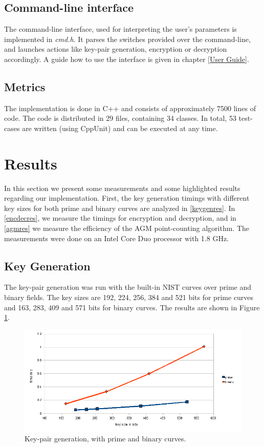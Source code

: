 \documentclass[11pt,english]{article}
\begin{document}
\subsection{Command-line interface}
The command-line interface, used for interpreting the user's parameters is implemented in \emph{cmd.h}. It parses the switches provided over the command-line, and launches actions like key-pair generation, encryption or decryption accordingly. A guide how to use the interface is given in chapter \ref{User Guide}.

\subsection{Metrics}
The implementation is done in C++ and consists of approximately 7500 lines of code. The code is distributed in 29 files, containing 34 classes. In total, 53 test-cases are written (using CppUnit) and can be executed at any time.

\section{Results}
In this section we present some measurements and some highlighted results regarding our implementation. First, the key generation timings with different key sizes for both prime and binary curves are analyzed in \ref{keygenres}. In \ref{encdecres}, we measure the timings for encryption and decryption, and in \ref{agmres} we measure the efficiency of the AGM point-counting algorithm. The measurements were done on an Intel Core Duo processor with 1.8 GHz.

\subsection{Key Generation}
The key-pair generation was run with the built-in NIST curves over prime and binary fields. The key sizes are 192, 224, 256, 384 and 521 bits for prime curves and 163, 283, 409 and 571 bits for binary curves. The results are shown in Figure \ref{figure:keygen}.

\label{keygenres}
\begin{figure}[h]
\centering
\includegraphics[scale=0.6]{keygen.png}
\caption{Key-pair generation, with prime and binary curves.}
\label{figure:keygen}
\end{figure}
\end{document}
